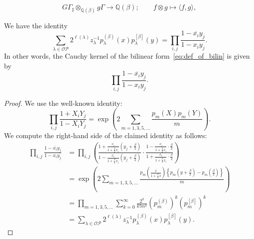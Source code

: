 \documentclass[10pt,a4paper]{amsart}
\begin{document}
\begin{equation}\label{eq:def_of_bilin}
G\Gamma_\sharp \otimes_{\mathbb{Q}(\beta)} g\Gamma \to \mathbb{Q}(\beta); \qquad 
f \otimes g \mapsto \langle f, g \rangle,
\end{equation}

\begin{thm}\label{thm:cauthyK}
We have the identity
\[
\sum_{\lambda \in \mathcal{OP}} 2^{\ell(\lambda)} z_\lambda^{-1} 
p_\lambda^{(\beta)}(x) p_\lambda^{[\beta]}(y) 
= \prod_{i,j} \frac{1 - \overline{x_i} y_j}{1 - x_i y_j}.
\]
In other words, the Cauchy kernel of the bilinear form~\eqref{eq:def_of_bilin} is given by 
\begin{equation}\label{eq:K-cauchy}
\prod_{i,j} \frac{1 - \overline{x_i} y_j}{1 - x_i y_j}.
\end{equation}
\end{thm}

\begin{proof}
We use the well-known identity:
\[
\prod_{i,j} \frac{1 + X_i Y_j}{1 - X_i Y_j}
= \exp\left( 2 \sum_{m=1,3,5,\dots} \frac{p_m(X) p_m(Y)}{m} \right).
\]
We compute the right-hand side of the claimed identity as follows:
\[
\begin{aligned}
\prod_{i,j} \frac{1 - \overline{x_i} y_j}{1 - x_i y_j}
&=
\prod_{i,j}
\left(
\frac{1 + \frac{x_i}{1 + \frac{\beta}{2} x_i}(y_j + \tfrac{\beta}{2})}
     {1 - \frac{x_i}{1 + \frac{\beta}{2} x_i}(y_j + \tfrac{\beta}{2})}
\cdot
\frac{1 - \frac{x_i}{1 + \frac{\beta}{2} x_i} \cdot \frac{\beta}{2}}
     {1 + \frac{x_i}{1 + \frac{\beta}{2} x_i} \cdot \frac{\beta}{2}}
\right) \\
&=
\exp\left( 
2 \sum_{m=1,3,5,\dots} \frac{
p_m\left( \frac{x}{1 + \frac{\beta}{2} x} \right)
\left\{ p_m(y + \tfrac{\beta}{2}) - p_m(\tfrac{\beta}{2}) \right\}
}{m}
\right) \\
&=
\prod_{m=1,3,5,\dots} \sum_{k=0}^\infty 
\frac{2^k}{k! m^k} 
(p_m^{(\beta)})^k (p_m^{[\beta]})^k \\
&=
\sum_{\lambda \in \mathcal{OP}} 
2^{\ell(\lambda)} z_\lambda^{-1} 
p_\lambda^{(\beta)}(x) p_\lambda^{[\beta]}(y).
\end{aligned}
\]
\end{proof}
\end{document}
